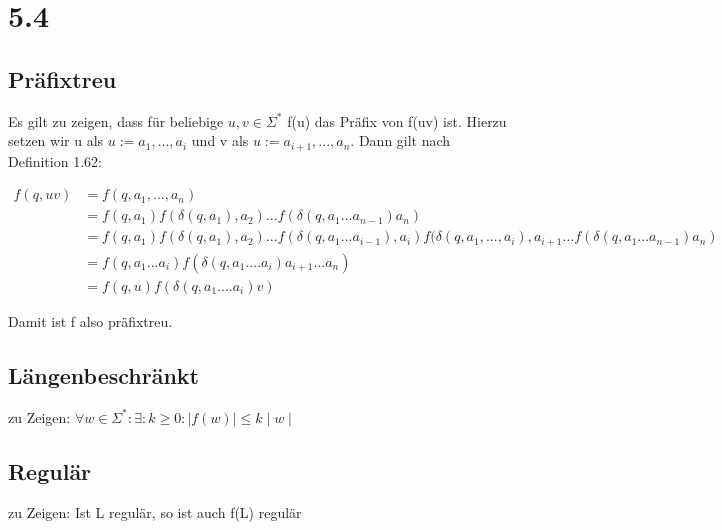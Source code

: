 \documentclass[12pt, a4paper]{article}
\begin{document}
\section*{5.4}
\subsection*{Präfixtreu}

Es gilt zu zeigen, dass für beliebige $u,v \in \Sigma^*$ f(u) das Präfix von f(uv) ist. Hierzu setzen wir u als $u := a_1,...,a_i$ und v als $u := a_{i+1},...,a_n$. Dann gilt nach Definition 1.62: 

\begin{align*}
f(q,uv) &= f(q, a_1,...,a_n) \\
&= f(q,a_1) f(\delta(q, a_1), a_2) ... f(\delta(q,a_1...a_{n-1})a_n) \\
&= f(q,a_1) f(\delta(q, a_1), a_2) ... f(\delta(q, a_1 ... a_{i-1}), a_i) f(\delta(q, a_1,..., a_i), a_{i+1} ...  f(\delta(q,a_1...a_{n-1})a_n) \\
&= f(q,a_1 ... a_i) f(\delta(q, a_1 .... a_i) a_{i+1} ... a_n) \\
&= f(q,u) f(\delta(q, a_1 .... a_i) v)
\end{align*}

Damit ist f also präfixtreu.

\subsection*{Längenbeschränkt}
zu Zeigen: $\forall w \in \Sigma^*: \exists: k \ge 0: \mid f(w) \mid \le k \mid w \mid $

\subsection*{Regulär}
zu Zeigen: Ist L regulär, so ist auch f(L) regulär
\end{document}
